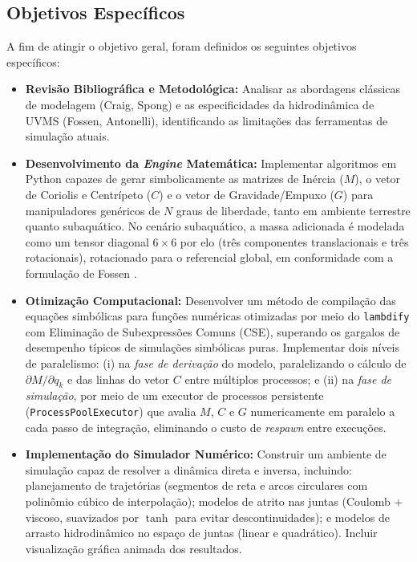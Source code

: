 \subsection{Objetivos Específicos}
\label{sec:Objetivos}

A fim de atingir o objetivo geral, foram definidos os seguintes objetivos específicos:

\begin{itemize}
    \item \textbf{Revisão Bibliográfica e Metodológica:} Analisar as abordagens clássicas de modelagem (Craig, Spong) e as especificidades da hidrodinâmica de UVMS (Fossen, Antonelli), identificando as limitações das ferramentas de simulação atuais.

    \item \textbf{Desenvolvimento da \textit{Engine} Matemática:} Implementar algoritmos em Python capazes de gerar simbolicamente as matrizes de Inércia ($M$), o vetor de Coriolis e Centrípeto ($C$) e o vetor de Gravidade/Empuxo ($G$) para manipuladores genéricos de $N$ graus de liberdade, tanto em ambiente terrestre quanto subaquático. No cenário subaquático, a massa adicionada é modelada como um tensor diagonal $6 \times 6$ por elo (três componentes translacionais e três rotacionais), rotacionado para o referencial global, em conformidade com a formulação de Fossen \cite{fossen2011handbook}.

    \item \textbf{Otimização Computacional:} Desenvolver um método de compilação das equações simbólicas para funções numéricas otimizadas por meio do \texttt{lambdify} com Eliminação de Subexpressões Comuns (CSE), superando os gargalos de desempenho típicos de simulações simbólicas puras. Implementar dois níveis de paralelismo: (i) na \textit{fase de derivação} do modelo, paralelizando o cálculo de $\partial M/\partial q_k$ e das linhas do vetor $C$ entre múltiplos processos; e (ii) na \textit{fase de simulação}, por meio de um executor de processos persistente (\texttt{ProcessPoolExecutor}) que avalia $M$, $C$ e $G$ numericamente em paralelo a cada passo de integração, eliminando o custo de \textit{respawn} entre execuções.

    \item \textbf{Implementação do Simulador Numérico:} Construir um ambiente de simulação capaz de resolver a dinâmica direta e inversa, incluindo: planejamento de trajetórias (segmentos de reta e arcos circulares com polinômio cúbico de interpolação); modelos de atrito nas juntas (Coulomb + viscoso, suavizados por $\tanh$ para evitar descontinuidades); e modelos de arrasto hidrodinâmico no espaço de juntas (linear e quadrático). Incluir visualização gráfica animada dos resultados.


\end{itemize}
